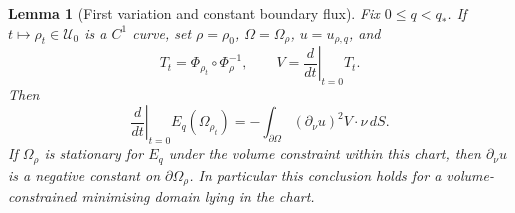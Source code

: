 \documentclass[11pt,a4paper]{article}
\newtheorem{lemma}[theorem]{Lemma}
\theoremstyle{definition}
\theoremstyle{remark}
\begin{document}
\begin{lemma}[First variation and constant boundary flux]
\label{lem:variation}
Fix $0\leq q<q_*$.  If $t\mapsto\rho_t\in\mathcal U_0$ is a $C^1$
curve, set $\rho=\rho_0$, $\Omega=\Omega_\rho$, $u=u_{\rho,q}$, and
\[
 T_t=\Phi_{\rho_t}\circ\Phi_\rho^{-1},\qquad
 V=\left.\frac{d}{dt}\right|_{t=0}T_t.
\]
Then
\begin{equation}
 \left.\frac{d}{dt}\right|_{t=0}E_q(\Omega_{\rho_t})
       =-\int_{\partial\Omega}(\partial_\nu u)^2V\cdot\nu\,dS.
 \label{eq:state-hadamard}
\end{equation}
If $\Omega_\rho$ is stationary for $E_q$ under the volume constraint
within this chart, then $\partial_\nu u$ is a negative constant on
$\partial\Omega_\rho$.  In particular this conclusion holds for a
volume-constrained minimising domain lying in the chart.
\end{lemma}
\end{document}
